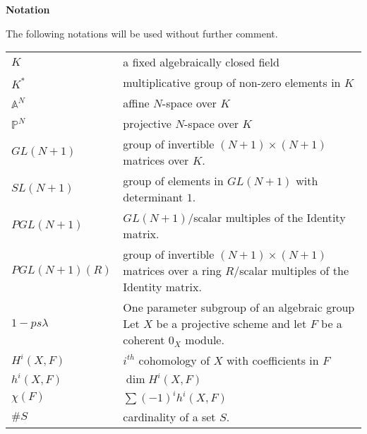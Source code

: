 \newpage
\noindent
\textbf{Notation}

The following notations will be used without further comment.

\medskip
\begin{tabular}{l p{7cm}}
$K$ & a fixed algebraically closed field\\
$K^*$ & multiplicative group of non-zero elements in $K$\\
$\mathbb{A}^N$ & affine $N$-space over $K$\\
$\mathbb{P}^N$ & projective $N$-space over $K$\\
$GL(N + 1)$ & group of invertible $(N + 1) \times (N + 1)$ matrices
  over $K$.\\ 
$SL(N + 1)$ & group of elements in $GL(N + 1)$ with determinant
  $1$.\\ 
$PGL(N + 1)$ & $GL(N + 1)$/scalar multiples of the Identity matrix.\\ 
$PGL(N + 1)(R)$ & group of invertible $(N + 1) \times (N + 1)$
  matrices over a ring $R$/scalar multiples of the Identity matrix.\\ 
$1-ps \lambda$ & One parameter subgroup of an algebraic group Let $X$
  be a projective scheme and let $F$ be a coherent $0_X$ module.\\ 
$H^i(X,F)$ & $i^{th}$ cohomology of $X$ with coefficients in $F$ \\ 
$h^i(X,F)$ & $\dim H^i(X,F)$\\
$\chi(F)$ & $\sum  (-1)^i  h^i(X,F)$\\ 
$\#S$ & cardinality of a set $S$.\\
\end{tabular}







